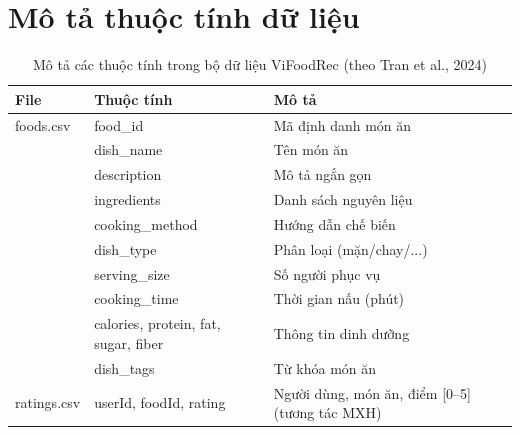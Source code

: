 \documentclass[11pt]{article}
\begin{document}
\section{Mô tả thuộc tính dữ liệu}
\begin{table}[t]
\centering
\caption{Mô tả các thuộc tính trong bộ dữ liệu ViFoodRec (theo Tran et al., 2024)}
\label{tab:attributes}
\small
\begin{tabular}{llp{7cm}}
\toprule
\textbf{File} & \textbf{Thuộc tính} & \textbf{Mô tả} \\\midrule
foods.csv & food\_id & Mã định danh món ăn \\& dish\_name & Tên món ăn \\& description & Mô tả ngắn gọn \\& ingredients & Danh sách nguyên liệu \\& cooking\_method & Hướng dẫn chế biến \\& dish\_type & Phân loại (mặn/chay/...) \\& serving\_size & Số người phục vụ \\& cooking\_time & Thời gian nấu (phút) \\& calories, protein, fat, sugar, fiber & Thông tin dinh dưỡng \\& dish\_tags & Từ khóa món ăn \\ratings.csv & userId, foodId, rating & Người dùng, món ăn, điểm [0--5] (tương tác MXH) \\\bottomrule
\end{tabular}
\end{table}



\end{document}
